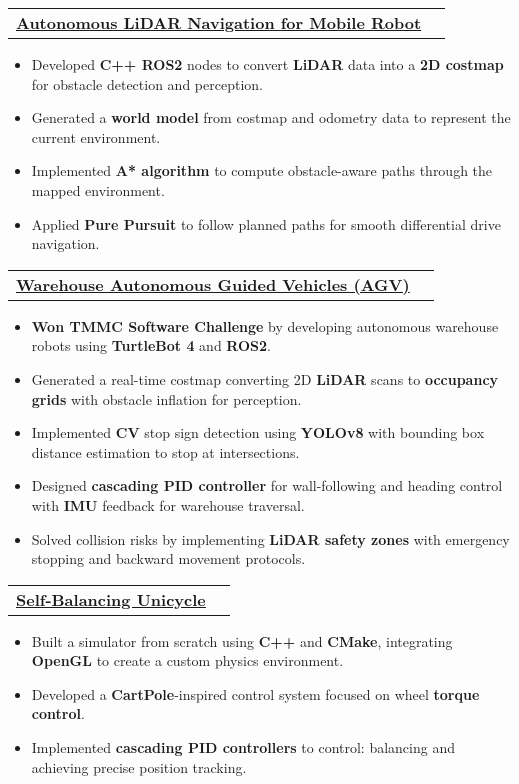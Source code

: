 \documentclass[letterpaper]{article}
\makeatletter
\newcommand{\resumeItem}[1]{
  \item\small{
    {#1 \vspace{-2pt}}
  }
}
\newcommand{\resumeProjectHeading}[2]{
    \item
    \begin{tabular*}{0.97\textwidth}{l@{\extracolsep{\fill}}r}
      \small#1 & #2 \\
    \end{tabular*}\vspace{-7pt}
}
\newcommand{\resumeItemListStart}{\begin{itemize}}
\newcommand{\resumeItemListEnd}{\end{itemize}\vspace{-5pt}}
\makeatother
\begin{document}
  \resumeProjectHeading
    {\textbf{\href{https://gavintranquilino.com/wato-asd-training}{\underline{Autonomous LiDAR Navigation for Mobile Robot}}} }{}
    \resumeItemListStart
      \resumeItem{Developed \textbf{C++ ROS2} nodes to convert \textbf{LiDAR} data into a \textbf{2D costmap} for obstacle detection and perception.}
      \resumeItem{Generated a \textbf{world model} from costmap and odometry data to represent the current environment.}
      \resumeItem{Implemented \textbf{A* algorithm} to compute obstacle-aware paths through the mapped environment.}
      \resumeItem{Applied \textbf{Pure Pursuit} to follow planned paths for smooth differential drive navigation.}
    \resumeItemListEnd

  \resumeProjectHeading
    {\textbf{\href{https://www.youtube.com/watch?v=ua6rOGYjlQI}{\underline{Warehouse Autonomous Guided Vehicles (AGV)}}} }{}
    \resumeItemListStart
      \resumeItem{\textbf{Won TMMC Software Challenge} by developing autonomous warehouse robots using \textbf{TurtleBot 4} and \textbf{ROS2}.}
      \resumeItem{Generated a real-time costmap converting 2D \textbf{LiDAR} scans to \textbf{occupancy grids} with obstacle inflation for perception.}
      \resumeItem{Implemented \textbf{CV} stop sign detection using \textbf{YOLOv8} with bounding box distance estimation to stop at intersections.}
      \resumeItem{Designed \textbf{cascading PID controller} for wall-following and heading control with \textbf{IMU} feedback for warehouse traversal.}
      \resumeItem{Solved collision risks by implementing \textbf{LiDAR safety zones} with emergency stopping and backward movement protocols.}
    \resumeItemListEnd

  \resumeProjectHeading
    {\textbf{\href{https://gavintranquilino.com/self-balancing-unicycle}{\underline{Self-Balancing Unicycle}}} }{}
    \resumeItemListStart
      \resumeItem{Built a simulator from scratch using \textbf{C++} and \textbf{CMake}, integrating \textbf{OpenGL} to create a custom physics environment.}
      \resumeItem{Developed a \textbf{CartPole}-inspired control system focused on wheel \textbf{torque control}.}
      \resumeItem{Implemented \textbf{cascading PID controllers} to control: balancing and achieving precise position tracking.}
    \resumeItemListEnd

\end{document}
